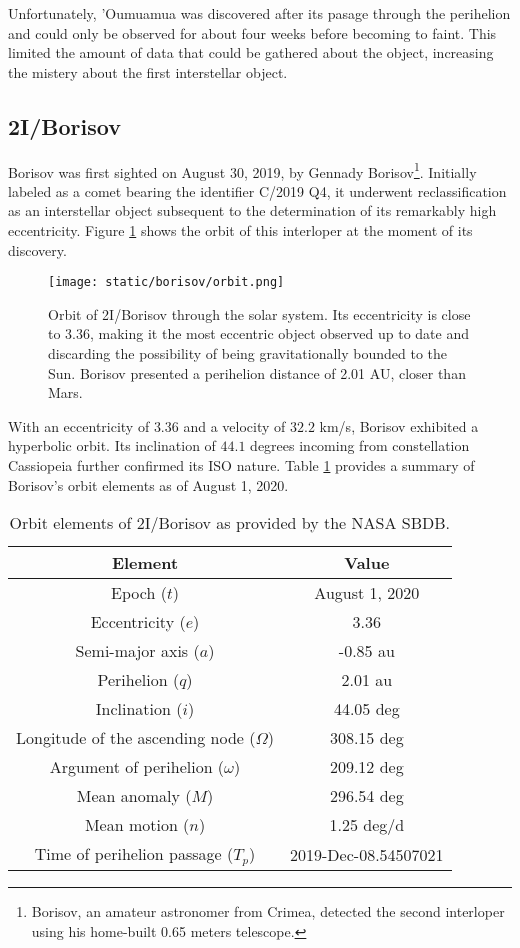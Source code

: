 Unfortunately, 'Oumuamua was discovered after its pasage through the perihelion
and could only be observed for about four weeks before becoming to faint. This
limited the amount of data that could be gathered about the object, increasing
the mistery about the first interstellar object.

\subsection{2I/Borisov}

Borisov was first sighted on August 30, 2019, by Gennady
Borisov\footnote{Borisov, an amateur astronomer from Crimea, detected the second
interloper using his home-built 0.65 meters telescope.}. Initially labeled as a
comet bearing the identifier C/2019 Q4, it underwent reclassification as an
interstellar object subsequent to the determination of its remarkably high
eccentricity. Figure \ref{fig:borisov_orbit} shows the orbit of this interloper
at the moment of its discovery.

\begin{figure}[H]
  \centering
  \texttt{[image: static/borisov/orbit.png]}
  \caption[Orbit of 2I/Borisov through the solar system]{
    Orbit of 2I/Borisov through the solar system. Its eccentricity is
    close to 3.36, making it the most eccentric object observed up to date
    and discarding the possibility of being gravitationally bounded to the Sun.
    Borisov presented a perihelion distance of 2.01 AU, closer than Mars.
  }
  \label{fig:borisov_orbit}
\end{figure}

With an eccentricity of $3.36$ and a velocity of $32.2$ km/s, Borisov exhibited
a hyperbolic orbit. Its inclination of $44.1$ degrees incoming from
constellation Cassiopeia further confirmed its ISO nature. Table
\ref{tab:borisov_elements} provides a summary of Borisov's orbit elements as of
August 1, 2020.

\begin{table}[H]
  \centering
  \begin{tabular}{|c|c|}
    \hline
    Element & Value \\
    \hline
    Epoch ($t$) & August 1, 2020 \\
    Eccentricity ($e$) & 3.36 \\
    Semi-major axis ($a$) & -0.85 au \\
    Perihelion ($q$) & 2.01 au \\
    Inclination ($i$) & 44.05 deg \\
    Longitude of the ascending node ($\Omega$) & 308.15 deg \\
    Argument of perihelion ($\omega$) & 209.12 deg \\
    Mean anomaly ($M$) & 296.54 deg \\
    Mean motion ($n$) & 1.25 deg/d \\
    Time of perihelion passage ($T_p$) & 2019-Dec-08.54507021 \\
    \hline
  \end{tabular}
  \caption{Orbit elements of 2I/Borisov as provided by the NASA SBDB.}
  \label{tab:borisov_elements}
\end{table}

